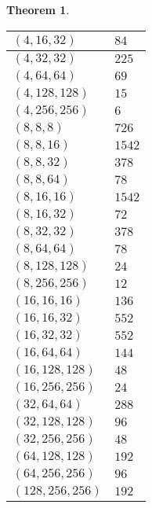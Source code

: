\documentclass{dcthesis}
\newcommand{\mm}[1]{{\color{blue} \sf MM: [#1]}}
\numberwithin{equation}{section}
\newtheorem{theorem}[equation]{Theorem}
\theoremstyle{definition}
\newtheorem{alg}[equation]{Algorithm}
\theoremstyle{remark}
\begin{document}
{{{\begin{theorem}
\begin{longtable}{|l|l|}
        $(4,16,32)$ & $84$ \\ \hline
        $(4,32,32)$ & $225$ \\ \hline
        $(4,64,64)$ & $69$ \\ \hline
        $(4,128,128)$ & $15$ \\ \hline
        $(4,256,256)$ & $6$ \\ \hline
        $(8,8,8)$ & $726$ \\ \hline
        $(8,8,16)$ & $1542$ \\ \hline
        $(8,8,32)$ & $378$ \\ \hline
        $(8,8,64)$ & $78$ \\ \hline
        $(8,16,16)$ & $1542$ \\ \hline
        $(8,16,32)$ & $72$ \\ \hline
        $(8,32,32)$ & $378$ \\ \hline
        $(8,64,64)$ & $78$ \\ \hline
        $(8,128,128)$ & $24$ \\ \hline
        $(8,256,256)$ & $12$ \\ \hline
        $(16,16,16)$ & $136$ \\ \hline
        $(16,16,32)$ & $552$ \\ \hline
        $(16,32,32)$ & $552$ \\ \hline
        $(16,64,64)$ & $144$ \\ \hline
        $(16,128,128)$ & $48$ \\ \hline
        $(16,256,256)$ & $24$ \\ \hline
        $(32,64,64)$ & $288$ \\ \hline
        $(32,128,128)$ & $96$ \\ \hline
        $(32,256,256)$ & $48$ \\ \hline
        $(64,128,128)$ & $192$ \\ \hline
        $(64,256,256)$ & $96$ \\ \hline
        $(128,256,256)$ & $192$ \\ \hline
      \end{longtable}
    \end{theorem}
}}}
\end{document}
